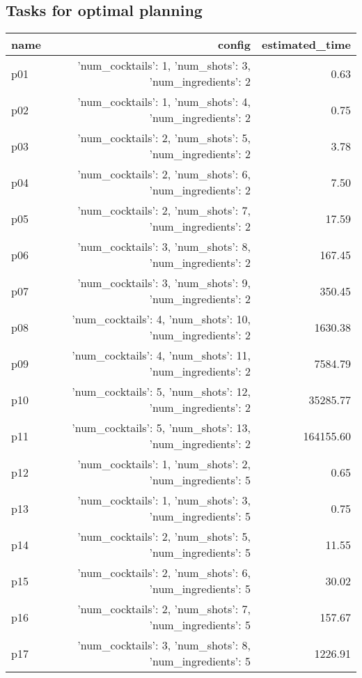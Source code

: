 \documentclass{article}
\begin{document}
                                \subsection*{Tasks for optimal planning}
                                
                            \begin{center}
                            \scriptsize
                            \begin{tabular}{@{}l|r|r@{}}
                            name & config & estimated\_time\\\midrule
                              p01&{'num\_cocktails': 1, 'num\_shots': 3, 'num\_ingredients': 2}&0.63\\
  p02&{'num\_cocktails': 1, 'num\_shots': 4, 'num\_ingredients': 2}&0.75\\
  p03&{'num\_cocktails': 2, 'num\_shots': 5, 'num\_ingredients': 2}&3.78\\
  p04&{'num\_cocktails': 2, 'num\_shots': 6, 'num\_ingredients': 2}&7.50\\
  p05&{'num\_cocktails': 2, 'num\_shots': 7, 'num\_ingredients': 2}&17.59\\
  p06&{'num\_cocktails': 3, 'num\_shots': 8, 'num\_ingredients': 2}&167.45\\
  p07&{'num\_cocktails': 3, 'num\_shots': 9, 'num\_ingredients': 2}&350.45\\
  p08&{'num\_cocktails': 4, 'num\_shots': 10, 'num\_ingredients': 2}&1630.38\\
  p09&{'num\_cocktails': 4, 'num\_shots': 11, 'num\_ingredients': 2}&7584.79\\
  p10&{'num\_cocktails': 5, 'num\_shots': 12, 'num\_ingredients': 2}&35285.77\\
  p11&{'num\_cocktails': 5, 'num\_shots': 13, 'num\_ingredients': 2}&164155.60\\
  p12&{'num\_cocktails': 1, 'num\_shots': 2, 'num\_ingredients': 5}&0.65\\
  p13&{'num\_cocktails': 1, 'num\_shots': 3, 'num\_ingredients': 5}&0.75\\
  p14&{'num\_cocktails': 2, 'num\_shots': 5, 'num\_ingredients': 5}&11.55\\
  p15&{'num\_cocktails': 2, 'num\_shots': 6, 'num\_ingredients': 5}&30.02\\
  p16&{'num\_cocktails': 2, 'num\_shots': 7, 'num\_ingredients': 5}&157.67\\
  p17&{'num\_cocktails': 3, 'num\_shots': 8, 'num\_ingredients': 5}&1226.91\\

\end{tabular}
\end{center}
\end{document}
